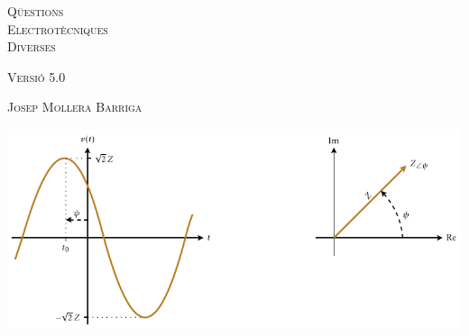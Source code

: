 \begin{titlepage}

   \parbox{18cm}{\fontsize{60pt}{60pt}\selectfont\color{NavyBlue}\scshape%
                 Q\"{u}estions\\[30pt] Electrot\`{e}cniques\\[30pt] Diverses}

   \vspace*{1.8cm}
   {\fontsize{30pt}{30pt}\selectfont\textsc{Versi\'{o} 5.0}}

   \vspace*{2cm}
   {\fontsize{40pt}{40pt}\selectfont\textsc{Josep Mollera Barriga}}

   \vspace*{1.5cm}
   \includegraphics[scale=1.3]{Imatges/Not-Fasor.pdf}
    
\end{titlepage}
